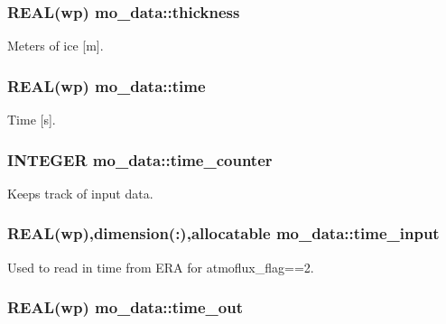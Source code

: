 \hypertarget{namespacemo__data_aab72953060065beb7d6f1d2b9fcafa5c}{
\subsubsection[{thickness}]{\setlength{\rightskip}{0pt plus 5cm}REAL(wp) {\bf mo\_\-data::thickness}}}
\label{namespacemo__data_aab72953060065beb7d6f1d2b9fcafa5c}


Meters of ice \mbox{[}m\mbox{]}. 

\hypertarget{namespacemo__data_a9a0ee3e136f3b09016bfdffed837615a}{
\subsubsection[{time}]{\setlength{\rightskip}{0pt plus 5cm}REAL(wp) {\bf mo\_\-data::time}}}
\label{namespacemo__data_a9a0ee3e136f3b09016bfdffed837615a}


Time \mbox{[}s\mbox{]}. 

\hypertarget{namespacemo__data_acabfab1b812c7dd4f73b2ec6b059cae1}{
\subsubsection[{time\_\-counter}]{\setlength{\rightskip}{0pt plus 5cm}INTEGER {\bf mo\_\-data::time\_\-counter}}}
\label{namespacemo__data_acabfab1b812c7dd4f73b2ec6b059cae1}


Keeps track of input data. 

\hypertarget{namespacemo__data_af2146601cc78d09fe2b51e065684822b}{
\subsubsection[{time\_\-input}]{\setlength{\rightskip}{0pt plus 5cm}REAL(wp),dimension(:),allocatable {\bf mo\_\-data::time\_\-input}}}
\label{namespacemo__data_af2146601cc78d09fe2b51e065684822b}


Used to read in time from ERA for atmoflux\_\-flag==2. 

\hypertarget{namespacemo__data_a98be98c2961c1d3ccfdf5a52682b78d1}{
\subsubsection[{time\_\-out}]{\setlength{\rightskip}{0pt plus 5cm}REAL(wp) {\bf mo\_\-data::time\_\-out}}}
\label{namespacemo__data_a98be98c2961c1d3ccfdf5a52682b78d1}


